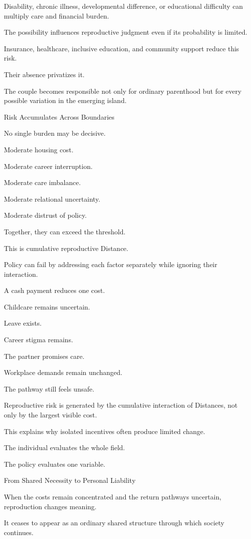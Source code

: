 Disability, chronic illness, developmental difference, or educational difficulty can multiply care and financial burden.

The possibility influences reproductive judgment even if its probability is limited.

Insurance, healthcare, inclusive education, and community support reduce this risk.

Their absence privatizes it.

The couple becomes responsible not only for ordinary parenthood but for every possible variation in the emerging island.

Risk Accumulates Across Boundaries

No single burden may be decisive.

Moderate housing cost.

Moderate career interruption.

Moderate care imbalance.

Moderate relational uncertainty.

Moderate distrust of policy.

Together, they can exceed the threshold.

This is cumulative reproductive Distance.

Policy can fail by addressing each factor separately while ignoring their interaction.

A cash payment reduces one cost.

Childcare remains uncertain.

Leave exists.

Career stigma remains.

The partner promises care.

Workplace demands remain unchanged.

The pathway still feels unsafe.

Reproductive risk is generated by the cumulative interaction of Distances, not only by the largest visible cost.

This explains why isolated incentives often produce limited change.

The individual evaluates the whole field.

The policy evaluates one variable.

From Shared Necessity to Personal Liability

When the costs remain concentrated and the return pathways uncertain, reproduction changes meaning.

It ceases to appear as an ordinary shared structure through which society continues.

